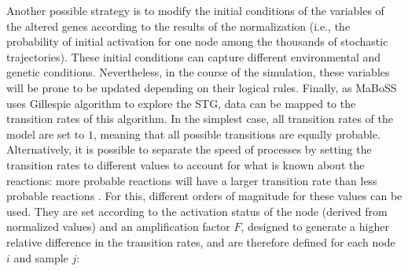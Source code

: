 \documentclass[a4paper,12pt,twoside,onecolumn,openright,final,oldfontcommands]{memoir}
\begin{document}
Another possible strategy is to modify the initial conditions of the
variables of the altered genes according to the results of the
normalization (i.e., the probability of initial activation for one node
among the thousands of stochastic trajectories). These initial
conditions can capture different environmental and genetic conditions.
Nevertheless, in the course of the simulation, these variables will be
prone to be updated depending on their logical rules. Finally, as MaBoSS
uses Gillespie algorithm to explore the STG, data can be mapped to the
transition rates of this algorithm. In the simplest case, all transition
rates of the model are set to \(1\), meaning that all possible
transitions are equally probable. Alternatively, it is possible to
separate the speed of processes by setting the transition rates to
different values to account for what is known about the reactions: more
probable reactions will have a larger transition rate than less probable
reactions \citep{stoll2012continuous}. For this, different orders of
magnitude for these values can be used. They are set according to the
activation status of the node (derived from normalized values) and an
amplification factor \(F\), designed to generate a higher relative
difference in the transition rates, and are therefore defined for each
node \(i\) and sample \(j\):
\end{document}
